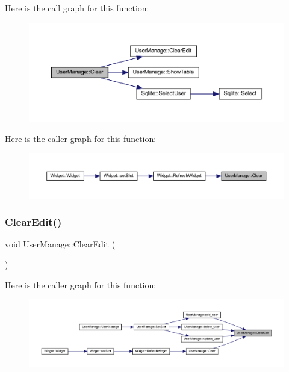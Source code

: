 Here is the call graph for this function\+:
\nopagebreak
\begin{figure}[H]
\begin{center}
\leavevmode
\includegraphics[width=350pt]{class_user_manage_af3849a855fdde995372d3162fb358472_cgraph}
\end{center}
\end{figure}
Here is the caller graph for this function\+:
\nopagebreak
\begin{figure}[H]
\begin{center}
\leavevmode
\includegraphics[width=350pt]{class_user_manage_af3849a855fdde995372d3162fb358472_icgraph}
\end{center}
\end{figure}
\mbox{\label{class_user_manage_afe9919891a0c86cb075ddb9bc12b2be6}} 
\subsubsection{\texorpdfstring{ClearEdit()}{ClearEdit()}}
{\footnotesize\ttfamily void User\+Manage\+::\+Clear\+Edit (\begin{DoxyParamCaption}{ }\end{DoxyParamCaption})}

Here is the caller graph for this function\+:
\nopagebreak
\begin{figure}[H]
\begin{center}
\leavevmode
\includegraphics[width=350pt]{class_user_manage_afe9919891a0c86cb075ddb9bc12b2be6_icgraph}
\end{center}
\end{figure}
\mbox{\label{class_user_manage_a254765c27c79b94370dd9f1e44551355}} 
